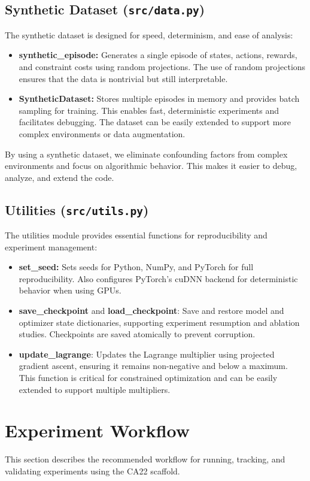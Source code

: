 \documentclass[11pt]{article}
\begin{document}
\subsection{Synthetic Dataset (\texttt{src/data.py})}
The synthetic dataset is designed for speed, determinism, and ease of analysis:
\begin{itemize}
  \item \textbf{synthetic\_episode:} Generates a single episode of states, actions, rewards, and constraint costs using random projections. The use of random projections ensures that the data is nontrivial but still interpretable.
  \item \textbf{SyntheticDataset:} Stores multiple episodes in memory and provides batch sampling for training. This enables fast, deterministic experiments and facilitates debugging. The dataset can be easily extended to support more complex environments or data augmentation.
\end{itemize}
By using a synthetic dataset, we eliminate confounding factors from complex environments and focus on algorithmic behavior. This makes it easier to debug, analyze, and extend the code.

\subsection{Utilities (\texttt{src/utils.py})}
The utilities module provides essential functions for reproducibility and experiment management:
\begin{itemize}
  \item \textbf{set\_seed:} Sets seeds for Python, NumPy, and PyTorch for full reproducibility. Also configures PyTorch's cuDNN backend for deterministic behavior when using GPUs.
  \item \textbf{save\_checkpoint} and \textbf{load\_checkpoint}: Save and restore model and optimizer state dictionaries, supporting experiment resumption and ablation studies. Checkpoints are saved atomically to prevent corruption.
  \item \textbf{update\_lagrange}: Updates the Lagrange multiplier using projected gradient ascent, ensuring it remains non-negative and below a maximum. This function is critical for constrained optimization and can be easily extended to support multiple multipliers.
\end{itemize}


\section{Experiment Workflow}
This section describes the recommended workflow for running, tracking, and validating experiments using the CA22 scaffold.
\end{document}
